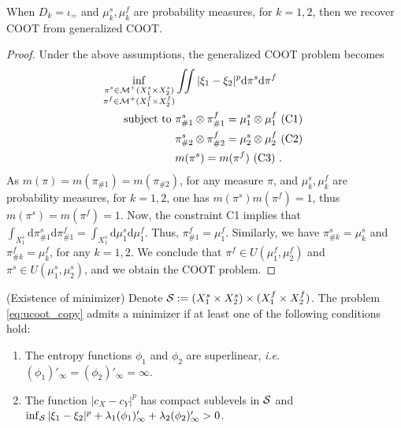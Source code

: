 \begin{claim}
  When $D_k = \iota_{=}$ and $\mu_k^s, \mu_k^f$ are probability measures, for $k=1,2$,
  then we recover COOT from generalized COOT.
\end{claim}
\begin{proof}
  Under the above assumptions, the generalized COOT problem becomes
  \begin{equation}
    \begin{split}
      \inf_{\substack{\pi^s \in \mathcal M^+(X_1^s \times X_2^s) \\
      \pi^f \in \mathcal M^+(X_1^f \times X_2^f)}}
      &\iint |\xi_1 - \xi_2|^p \mathrm d\pi^s \mathrm d \pi^f \\
      \text{subject to } &\pi^s_{\#1} \otimes \pi^f_{\#1} = \mu_1^s \otimes \mu_1^f \text{ (C1) } \\
      & \pi^s_{\#2} \otimes \pi^f_{\#2} = \mu_2^s \otimes \mu_2^f \text{ (C2) } \\
      & m(\pi^s) = m(\pi^f) \text{ (C3) }.
    \end{split}
  \end{equation}
  As $m(\pi) = m(\pi_{\#1}) = m(\pi_{\#2})$,
  for any measure $\pi$, and $\mu_k^s, \mu_k^f$ are probability measures, for $k=1,2$,
  one has $m(\pi^s) m(\pi^f) = 1$, thus $m(\pi^s) = m(\pi^f) = 1$.
  Now, the constraint C1 implies that
  $\int_{X_1^s} \mathrm d\pi^s_{\#1} \mathrm d \pi^f_{\#1}
  = \int_{X_1^s} \mathrm d\mu_1^s \mathrm d\mu_1^f$. Thus, $\pi^f_{\#1} = \mu_1^f$.
  Similarly, we have $\pi^s_{\#k} = \mu_k^s$ and $\pi^f_{\#k} = \mu_k^f$, for any $k=1,2$.
  We conclude that $\pi^f \in U(\mu_1^f, \mu_2^f)$ and $\pi^s \in U(\mu_1^s, \mu_2^s)$,
  and we obtain the COOT problem.
\end{proof}

\begin{proposition}
    \label{eq:ucoot_existence_copy}
  (Existence of minimizer) Denote
  $\mathcal S := (X_1^s \times X_2^s) \times (X_1^f \times X_2^f)$.
  The problem \ref{eq:ucoot_copy} admits a minimizer if at least one of
  the following conditions hold:
  \begin{enumerate}
    \item The entropy functions $\phi_1$ and $\phi_2$ are superlinear, \textit{i.e}.
    $(\phi_1)'_{\infty} = (\phi_2)'_{\infty} = \infty$.
    \item The function $\vert c_X - c_Y \vert^p$ has compact sublevels in $\mathcal S$ and
    $\inf_{\mathcal S} \vert \xi_1 - \xi_2 \vert^p + \lambda_1 (\phi_1)'_{\infty} + \lambda_2 (\phi_2)'_{\infty} > 0$.
  \end{enumerate}
\end{proposition}

